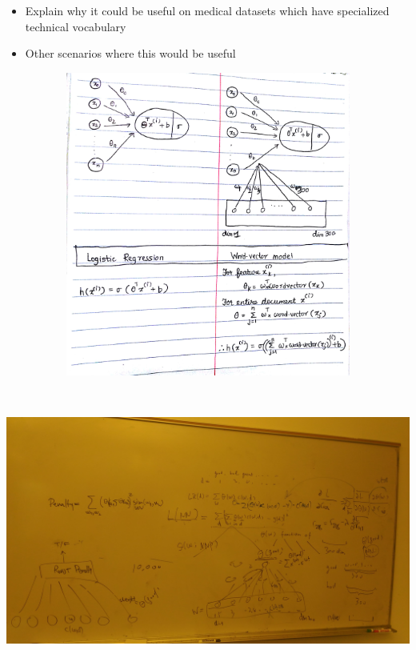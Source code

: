 \begin{itemize}
\item Explain why it could be useful on medical datasets which have specialized technical vocabulary

\item Other scenarios where this would be useful
\end{itemize}




\includegraphics[width=16cm, height=10cm]{wordvec.jpg}\\[1cm]
\includegraphics[width=16cm, height=10cm]{cheng.jpg}\\[1cm]

